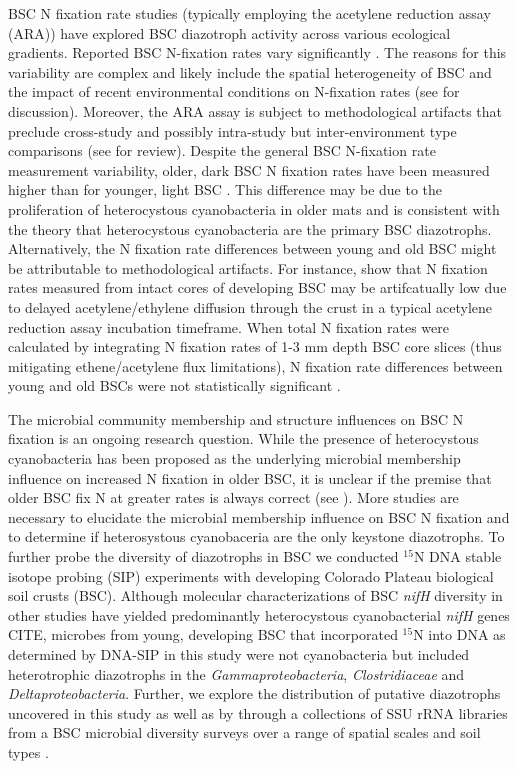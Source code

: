 BSC N fixation rate studies (typically employing the acetylene reduction assay (ARA)) have explored BSC diazotroph activity across various ecological gradients. Reported BSC N-fixation rates vary significantly \cite{Evans_2001}. The reasons for this variability are complex and likely include the spatial heterogeneity of BSC \cite{Evans_2001} and the impact of recent environmental conditions on N-fixation rates (see \citet{Belnap_2001} for discussion). Moreover, the ARA assay is subject to methodological artifacts that preclude cross-study and possibly intra-study but inter-environment type comparisons (see \citet{Belnap_2001} for review). Despite the general BSC N-fixation rate measurement variability, older, dark BSC N fixation rates have been measured higher than for younger, light BSC \cite{Belnap_2002}. This difference may be due to the proliferation of heterocystous cyanobacteria in older mats and is consistent with the theory that heterocystous cyanobacteria are the primary BSC diazotrophs. Alternatively, the N fixation rate differences between young and old BSC might be attributable to methodological artifacts. For instance, \citet{15643930} show that N fixation rates measured from intact cores of developing BSC may be artifcatually low due to delayed acetylene/ethylene diffusion through the crust in a typical acetylene reduction assay incubation timeframe. When total N fixation rates were calculated by integrating N fixation rates of 1-3 mm depth BSC core slices (thus mitigating ethene/acetylene flux limitations), N fixation rate differences between young and old BSCs were not statistically significant \cite{15643930}.

The microbial community membership and structure influences on BSC N fixation is an ongoing research question. While the presence of heterocystous cyanobacteria has been proposed as the underlying microbial membership influence on increased N fixation in older BSC, it is unclear if the premise that older BSC fix N at greater rates is always correct (see \citet{15643930}). More studies are necessary to elucidate the microbial membership influence on BSC N fixation and to determine if  heterosystous cyanobaceria are the only keystone diazotrophs. To further probe the diversity of diazotrophs in BSC we conducted $^{15}$N DNA stable isotope probing (SIP) experiments with developing Colorado Plateau biological soil crusts (BSC). Although molecular characterizations of BSC \textit{nifH} diversity in other studies have yielded predominantly heterocystous cyanobacterial \textit{nifH} genes CITE, microbes from young, developing BSC that incorporated $^{15}$N into DNA as determined by DNA-SIP in this study were not cyanobacteria but included heterotrophic diazotrophs in the \textit{Gammaproteobacteria}, \textit{Clostridiaceae} and \textit{Deltaproteobacteria}. Further, we explore the distribution of putative diazotrophs uncovered in this study as well as by \cite{14766579, Yeager, Yeager_2012} through a collections of SSU rRNA libraries from a BSC microbial diversity surveys over a range of spatial scales and soil types \cite{Garcia_Pichel_2013, Steven_2013}.  